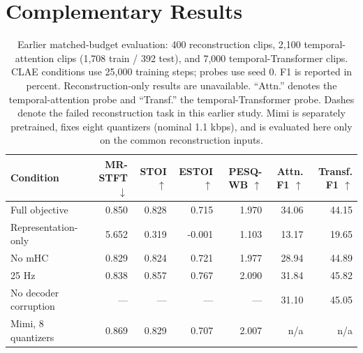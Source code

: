 \documentclass[11pt,a4paper]{article}
\begin{document}
\clearpage
\begin{table}[p]
\section{Complementary Results}
\label{sec:complementary}
\centering
\small
\setlength{\tabcolsep}{4pt}
\begin{tabular}{@{}lrrrrrr@{}}
\toprule
Condition & MR-STFT $\downarrow$ & STOI $\uparrow$ & ESTOI $\uparrow$ & PESQ-WB $\uparrow$ & Attn. F1 $\uparrow$ & Transf. F1 $\uparrow$ \\
\midrule
Full objective & 0.850 & 0.828 & 0.715 & 1.970 & 34.06 & 44.15 \\
Representation-only & 5.652 & 0.319 & -0.001 & 1.103 & 13.17 & 19.65 \\
No mHC & 0.829 & 0.824 & 0.721 & 1.977 & 28.94 & 44.89 \\
25 Hz & 0.838 & 0.857 & 0.767 & 2.090 & 31.84 & 45.82 \\
No decoder corruption & --- & --- & --- & --- & 31.10 & 45.05 \\
Mimi, 8 quantizers & 0.869 & 0.829 & 0.707 & 2.007 & n/a & n/a \\
\bottomrule
\end{tabular}
\caption{Earlier matched-budget evaluation: 400 reconstruction clips, 2,100 temporal-attention clips (1,708 train / 392 test), and 7,000 temporal-Transformer clips. CLAE conditions use 25,000 training steps; probes use seed 0. F1 is reported in percent. Reconstruction-only results are unavailable. ``Attn.'' denotes the temporal-attention probe and ``Transf.'' the temporal-Transformer probe. Dashes denote the failed reconstruction task in this earlier study. Mimi is separately pretrained, fixes eight quantizers (nominal 1.1 kbps), and is evaluated here only on the common reconstruction inputs.}
\label{tab:ablation}
\end{table}
\end{document}
